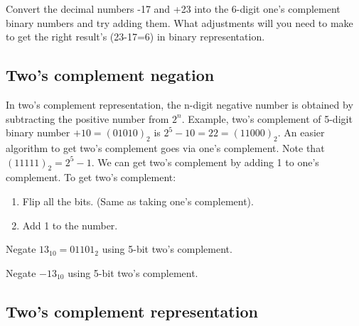 \begin{prob}
  Convert the decimal numbers -17 and +23 into the 6-digit one's complement binary numbers and try adding them. What
  adjustments will you need to make to get the right result's (23-17=6) in binary representation.
\end{prob}
\vspace{20em}


\subsection{Two's complement negation}
In two's complement representation, the n-digit negative number is obtained by
subtracting the positive number from $2^{n}$. Example, two's
complement of 5-digit binary number $+10 = (01010)_2$ is $2^5 - 10 = 22 =
(11000)_2$. An easier algorithm to get two's complement goes via one's
complement. Note that $(11111)_2 = 2^5-1$. We can get two's complement by adding
1 to one's complement. To get two's complement:
\begin{enumerate}
\item Flip all the bits. (Same as taking one's complement).
\item Add 1 to the number.
\end{enumerate}

\noindent Negate $13_{10} = 01101_2$ using 5-bit two's complement.
\vspace{10em}

\noindent Negate $-13_{10}$ using 5-bit two's complement.
\vspace{10em}



\subsection{Two's complement representation}

\vspace{20em}


